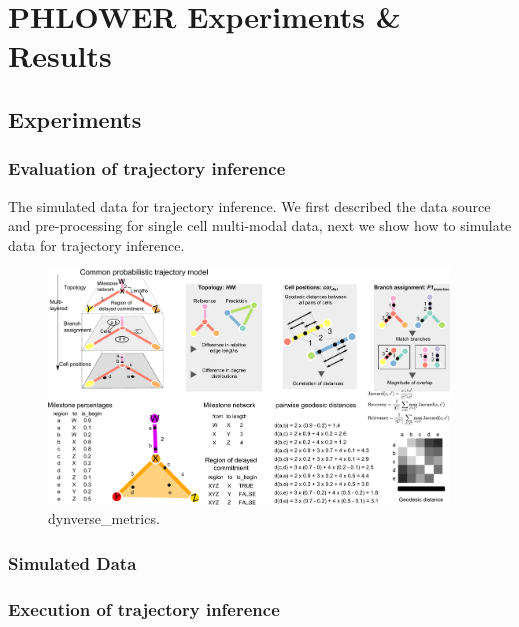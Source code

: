 \chapter{PHLOWER Experiments \& Results}
\label{chapter:PHLOWER_bench}

\graphicspath{{chapter5/figs}}

\section{Experiments}
\subsection{Evaluation of trajectory inference}
The simulated data for trajectory inference. We first described the data source and pre-processing for single cell multi-modal data, next we show how to simulate data for trajectory inference.
\begin{figure}[!ht]
	\centering
	\includegraphics[width=0.95\textwidth]{dynverse_metrics/fig}
	\vspace{0.1cm}
	\caption[dynverse\_metrics]{
	dynverse\_metrics.}
	\label{fig:dynverse_metrics}
\end{figure}
\subsection{Simulated Data}
\subsection{Execution of trajectory inference}
